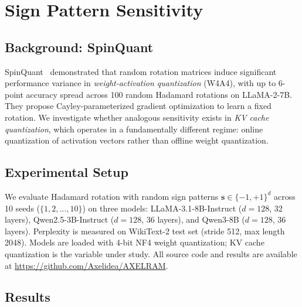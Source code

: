 \documentclass[conference]{IEEEtran}
\begin{document}
\section{Sign Pattern Sensitivity}
\label{sec:sensitivity}

\subsection{Background: SpinQuant}
SpinQuant~\cite{spinquant} demonstrated that random rotation matrices induce significant performance variance in \emph{weight-activation quantization} (W4A4), with up to 6-point accuracy spread across 100 random Hadamard rotations on LLaMA-2-7B.
They propose Cayley-parameterized gradient optimization to learn a fixed rotation.
We investigate whether analogous sensitivity exists in \emph{KV cache quantization}, which operates in a fundamentally different regime: online quantization of activation vectors rather than offline weight quantization.

\subsection{Experimental Setup}
We evaluate Hadamard rotation with random sign patterns $\mathbf{s} \in \{-1,+1\}^d$ across 10 seeds ($\{1, 2, \ldots, 10\}$) on three models:
LLaMA-3.1-8B-Instruct ($d{=}128$, 32 layers),
Qwen2.5-3B-Instruct ($d{=}128$, 36 layers), and
Qwen3-8B ($d{=}128$, 36 layers).
Perplexity is measured on WikiText-2 test set (stride 512, max length 2048).
Models are loaded with 4-bit NF4 weight quantization; KV cache quantization is the variable under study.
All source code and results are available at \url{https://github.com/Axelidea/AXELRAM}.

\subsection{Results}
\end{document}

